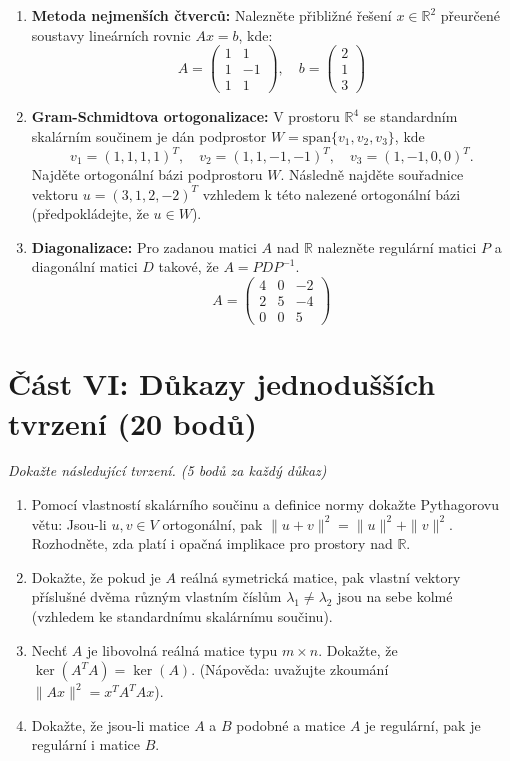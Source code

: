\documentclass[a4paper,11pt]{article}
\begin{document}
\begin{enumerate}
    \item \textbf{Metoda nejmenších čtverců:} Nalezněte přibližné řešení $x \in \mathbb{R}^2$ přeurčené soustavy lineárních rovnic $Ax = b$, kde:
    $$
    A = \begin{pmatrix} 1 & 1 \\ 1 & -1 \\ 1 & 1 \end{pmatrix}, \quad b = \begin{pmatrix} 2 \\ 1 \\ 3 \end{pmatrix}
    $$

    \item \textbf{Gram-Schmidtova ortogonalizace:} V prostoru $\mathbb{R}^4$ se standardním skalárním součinem je dán podprostor $W = \text{span}\{v_1, v_2, v_3\}$, kde
    $$ v_1 = (1, 1, 1, 1)^T, \quad v_2 = (1, 1, -1, -1)^T, \quad v_3 = (1, -1, 0, 0)^T. $$
    Najděte ortogonální bázi podprostoru $W$. Následně najděte souřadnice vektoru $u = (3, 1, 2, -2)^T$ vzhledem k této nalezené ortogonální bázi (předpokládejte, že $u \in W$).

    \item \textbf{Diagonalizace:} Pro zadanou matici $A$ nad $\mathbb{R}$ nalezněte regulární matici $P$ a diagonální matici $D$ takové, že $A = PDP^{-1}$.
    $$
    A = \begin{pmatrix}
    4 & 0 & -2 \\
    2 & 5 & -4 \\
    0 & 0 &  5
    \end{pmatrix}
    $$
\end{enumerate}

\vspace{0.5cm}

\section*{Část VI: Důkazy jednodušších tvrzení (20 bodů)}
\textit{Dokažte následující tvrzení. (5 bodů za každý důkaz)}

\begin{enumerate}
    \item Pomocí vlastností skalárního součinu a definice normy dokažte Pythagorovu větu: Jsou-li $u, v \in V$ ortogonální, pak $\|u + v\|^2 = \|u\|^2 + \|v\|^2$. Rozhodněte, zda platí i opačná implikace pro prostory nad $\mathbb{R}$.
    \item Dokažte, že pokud je $A$ reálná symetrická matice, pak vlastní vektory příslušné dvěma různým vlastním číslům $\lambda_1 \neq \lambda_2$ jsou na sebe kolmé (vzhledem ke standardnímu skalárnímu součinu).
    \item Nechť $A$ je libovolná reálná matice typu $m \times n$. Dokažte, že $\ker(A^T A) = \ker(A)$. (Nápověda: uvažujte zkoumání $\|Ax\|^2 = x^T A^T A x$).
    \item Dokažte, že jsou-li matice $A$ a $B$ podobné a matice $A$ je regulární, pak je regulární i matice $B$.
\end{enumerate}
\end{document}
